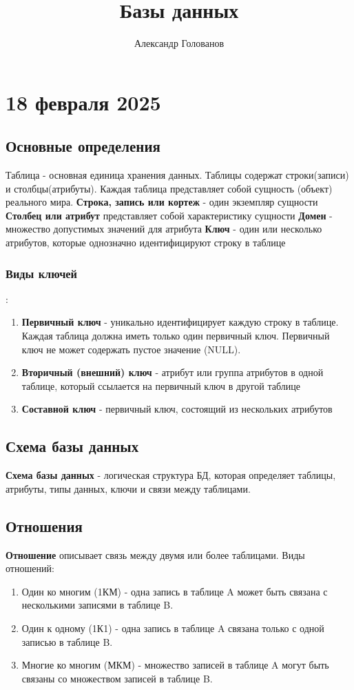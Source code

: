 \documentclass[]{article}
\title{Базы данных}
\author{Александр Голованов}
\begin{document}
\maketitle
\newpage
\tableofcontents
\newpage

\section{18 февраля 2025}
\subsection{Основные определения}
Таблица - основная единица хранения данных. Таблицы содержат строки(записи) и столбцы(атрибуты). Каждая таблица представляет собой сущность (объект) реального мира.
\newline
\textbf{Строка, запись или кортеж} - один экземпляр сущности
\newline
\textbf{Столбец или атрибут} представляет собой характеристику сущности
\newline
\textbf{Домен} - множество допустимых значений для атрибута
\newline
\textbf{Ключ} - один или несколько атрибутов, которые однозначно идентифицируют строку в таблице
\newline 
 \subsubsection{Виды ключей}: 
\begin{enumerate}
\item \textbf{Первичный ключ} - уникально идентифицирует каждую строку в таблице. Каждая таблица должна иметь только один первичный ключ. Первичный ключ не может содержать пустое значение (NULL).
\item \textbf{Вторичный (внешний) ключ} - атрибут или группа атрибутов в одной таблице, который ссылается на первичный ключ в другой таблице
\item \textbf{Составной ключ} - первичный ключ, состоящий из нескольких атрибутов
\end{enumerate}
\subsection{Схема базы данных}
\textbf{Схема базы данных} - логическая структура БД, которая определяет таблицы, атрибуты, типы данных, ключи и связи между таблицами. 

\subsection{Отношения}
\textbf{Отношение} описывает связь между двумя или более таблицами. 
Виды отношений:
\begin{enumerate}
\item Один ко многим (1КМ) - одна запись в таблице A может быть связана с несколькими записями в таблице B.
\item Один к одному (1К1) - одна запись в таблице A связана только с одной записью в таблице B.
\item Многие ко многим (МКМ) - множество записей в таблице A могут быть связаны со множеством записей в таблице B. 
\end{enumerate}
\end{document}
